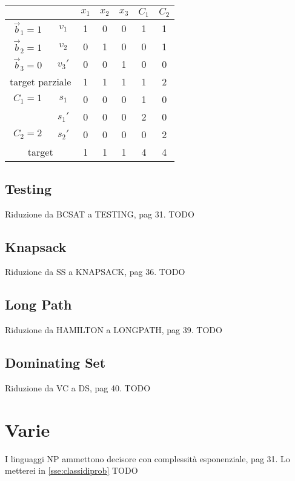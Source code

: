 \begin{center}
    \begin{tabular}[h]{cc|ccc|cc}
                         &        & $x_1$ & $x_2$ & $x_3$ & $C_1$ & $C_2$ \\
        \hline
        $\vec{b}_1 = 1 $ & $v_1$  & 1 & 0 & 0 & 1 & 1 \\
        $\vec{b}_2 = 1 $ & $v_2$  & 0 & 1 & 0 & 0 & 1 \\
        $\vec{b}_3 = 0 $ & $v_3'$ & 0 & 0 & 1 & 0 & 0 \\
        \hline
        \multicolumn{2}{c}{target parziale}  & 1 & 1 & 1 & 1 & 2 \\
        \hline
        $C_1 = 1$ & $s_1$  & 0 & 0 & 0 & 1 & 0 \\
                  & $s_1'$ & 0 & 0 & 0 & 2 & 0 \\
        $C_2 = 2$ & $s_2'$ & 0 & 0 & 0 & 0 & 2 \\
        \hline
        \multicolumn{2}{c}{target} & 1 & 1 & 1 & 4 & 4 \\
    \end{tabular}
\end{center}

\subsection{Testing}
Riduzione da BCSAT a TESTING, pag 31.
TODO

\subsection{Knapsack}
Riduzione da SS a KNAPSACK, pag 36.
TODO

\subsection{Long Path}
Riduzione da HAMILTON a LONGPATH, pag 39.
TODO

\subsection{Dominating Set}
Riduzione da VC a DS, pag 40.
TODO

\section{Varie}
I linguaggi NP ammettono decisore con complessità esponenziale, pag 31.
Lo metterei in \ref{sse:classidiprob}
TODO

